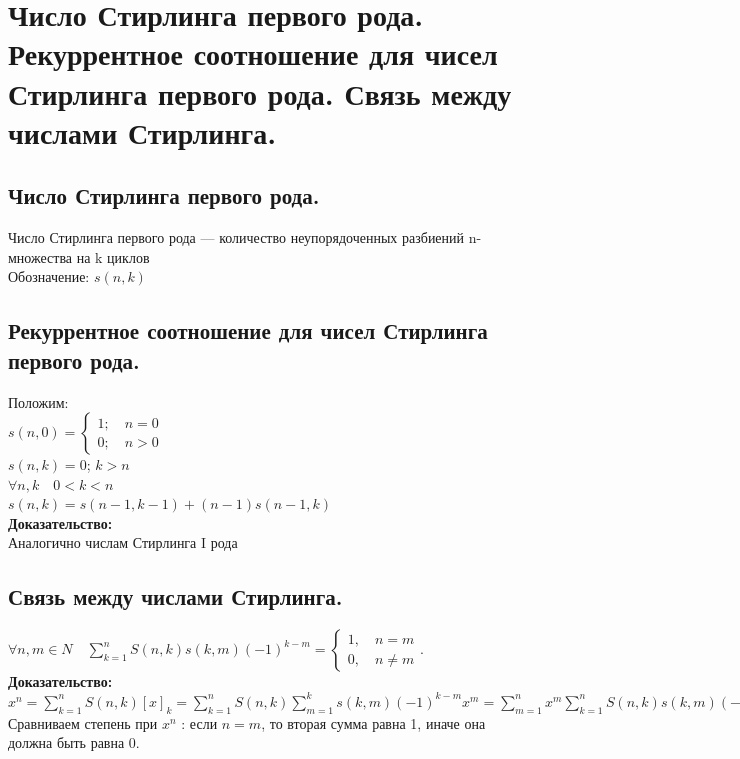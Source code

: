 \documentclass[12pt]{article}
\begin{document}
\section{Число Стирлинга первого рода. Рекуррентное соотношение для чисел Стирлинга первого рода. Связь между числами Стирлинга.}
	\subsection{Число Стирлинга первого рода.}
		Число Стирлинга первого рода — количество неупорядоченных разбиений n-множества на k циклов\\
		Обозначение: $s(n,k)$\\
	\subsection{Рекуррентное соотношение для чисел Стирлинга первого рода.}
		Положим:\\
		$s(n,0) = \begin{cases}
		1; \quad n=0\\
		0; \quad n>0
		\end{cases}$\\
		$s(n,k) = 0$; \quad $k > n$\\

		$\forall n,k \quad 0 < k < n$\\
		$s(n,k) = s(n-1,k-1) + (n-1)s(n-1,k)$\\
		\textbf{Доказательство:}\\
			Аналогично числам Стирлинга I рода\\
		\qedsymbol
	\subsection{Связь между числами Стирлинга.}
		$ \displaystyle \forall n,m \in N\quad \sum_{k=1}^n S(n,k)s(k,m)(-1)^{k-m} = \begin{cases}1, \quad n=m \\ 0, \quad n \ne m \end{cases}$.\\
	\textbf{Доказательство:}\\
		$ \displaystyle x^n = \sum_{k=1}^n S(n,k) [x]_k = \sum_{k=1}^n S(n,k) \sum_{m=1}^k s(k,m)(-1)^{k-m}x^m= \sum_{m=1}^n
		x^m \sum_{k=1}^n S(n,k) s(k,m) (-1)^{k-m}x^m $\\
		Сравниваем степень при $x^n$ : если $n = m$, то вторая сумма равна 1, иначе она должна быть равна 0.\\
	\qedsymbol
\end{document}
